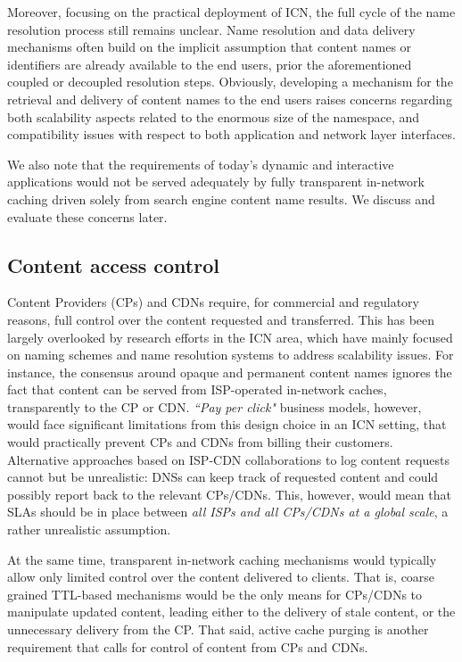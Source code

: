 \documentclass{sig-alternate}
\begin{document}
Moreover, focusing on the practical deployment of ICN, the full cycle of the name resolution process still remains unclear. 
Name resolution and data delivery mechanisms often build on the implicit assumption that content names or identifiers are already available to the end users, prior the aforementioned coupled or decoupled resolution steps. 
Obviously, developing a mechanism for the retrieval and delivery of content names to the end users raises concerns regarding both scalability aspects related to the enormous size of the namespace, and compatibility issues with respect to both application and network layer interfaces. 

We also note that the requirements of today's dynamic and interactive applications would not be served adequately by fully transparent in-network caching driven solely from search engine content name results. We discuss and evaluate these concerns later.

\subsection{Content access control}



Content Providers (CPs) and CDNs require, for commercial and regulatory reasons, full control over the content requested and transferred.
This has been largely overlooked by research efforts in the ICN area, which have mainly focused on naming schemes and name resolution systems to address scalability issues.
For instance, the consensus around {opaque} and {permanent} content names ignores the fact that content can be served from ISP-operated in-network caches, transparently to the CP or CDN.
\textit{``Pay per click"} business models, however, would face significant limitations from this design choice in an ICN setting, that would practically prevent CPs and CDNs from billing their customers. 
Alternative approaches based on ISP-CDN collaborations to log content requests cannot but be unrealistic: DNSs can keep track of requested content and could possibly report back to the relevant CPs/CDNs. This, however, would mean that SLAs should be in place between \textit{all ISPs and all CPs/CDNs at a global scale}, a rather unrealistic assumption. 


At the same time, transparent in-network caching mechanisms would typically allow only limited control over the content delivered to clients. That is, coarse grained TTL-based mechanisms would be the only means for CPs/CDNs to manipulate updated content, leading either to the delivery of stale content, or the unnecessary delivery from the CP. That said, active cache purging is another requirement that calls for control of content from CPs and CDNs.
\end{document}
